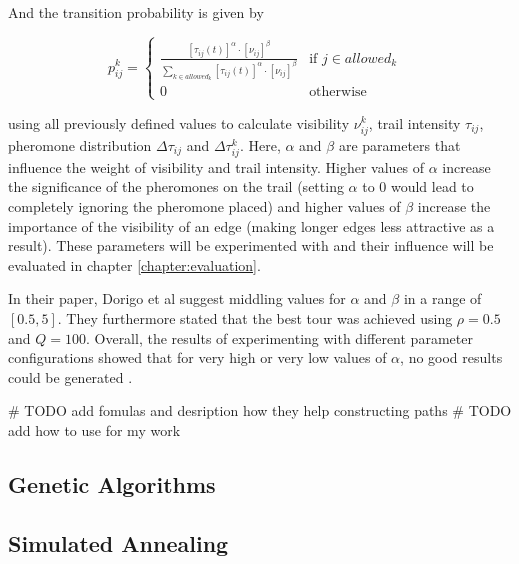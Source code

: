 And the transition probability is given by

\begin{equation}\label{eq:transitionProbability}
	p_{ij}^k = \begin{cases}
		\frac{[\tau_{ij}(t)]^{\alpha} \cdot [\nu_{ij}]^{\beta}}{\sum_{k \in allowed_k} [\tau_{ij}(t)]^{\alpha} \cdot [\nu_{ij}]^{\beta}} &\text{if $j \in allowed_k$ }\\
		0 &\text{otherwise}
	\end{cases}
\end{equation}

using all previously defined values to calculate visibility $\nu_{ij}^k$, trail intensity $\tau_{ij}$, pheromone distribution $\Delta\tau_{ij}$ and $\Delta\tau_{ij}^k$.
Here, $\alpha$ and $\beta$ are parameters that influence the weight of visibility and trail intensity.
Higher values of $\alpha$ increase the significance of the pheromones on the trail (setting $\alpha$ to 0 would lead to completely ignoring the pheromone placed) and higher values of $\beta$ increase the importance of the visibility of an edge (making longer edges less attractive as a result)\cite{dorigo_ant_1996}.
These parameters will be experimented with and their influence will be evaluated in chapter \ref{chapter:evaluation}.

In their paper, Dorigo et al suggest middling values for $\alpha$ and $\beta$ in a range of $[0.5,5]$.
They furthermore stated that the best tour was achieved using $\rho = 0.5$ and $Q=100$.
Overall, the results of experimenting with different parameter configurations showed that for very high or very low values of $\alpha$, no good results could be generated \cite{dorigo_ant_1996}.



\# TODO add fomulas and desription how they help constructing paths
\# TODO add how to use for my work

\subsection{Genetic Algorithms}
\label{subsec:geneticAlgorithmsBackground}

\subsection{Simulated Annealing}
\label{subsec:simulatedAnnealingBackground}